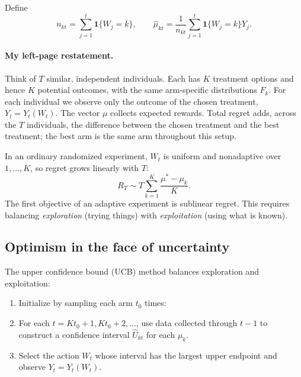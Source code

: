 Define
\[
 n_{kt}=\sum_{j=1}^t\mathbf1\{W_j=k\},\qquad
 \widehat\mu_{kt}=\frac1{n_{kt}}\sum_{j=1}^t\mathbf1\{W_j=k\}Y_j.
\]

\paragraph{My left-page restatement.}
Think of $T$ similar, independent individuals. Each has $K$ treatment options and hence $K$ potential outcomes, with the same arm-specific distributions $F_k$. For each individual we observe only the outcome of the chosen treatment, $Y_t=Y_t(W_t)$. The vector $\mu$ collects expected rewards. Total regret adds, across the $T$ individuals, the difference between the chosen treatment and the best treatment; the best arm is the same arm throughout this setup.

In an ordinary randomized experiment, $W_t$ is uniform and nonadaptive over $1,\ldots,K$, so regret grows linearly with $T$:
\[
 R_T\sim T\sum_{k=1}^K\frac{\mu^*-\mu_k}{K}.
\]
 The first objective of an adaptive experiment is sublinear regret.  This requires balancing \emph{exploration} (trying things) with \emph{exploitation} (using what is known).

\subsection{Optimism in the face of uncertainty}
The upper confidence bound (UCB) method balances exploration and exploitation:
\begin{enumerate}
 \item Initialize by sampling each arm $t_0$ times: 
 \item For each $t=Kt_0+1,Kt_0+2,\ldots$, use data collected through $t-1$ to construct a confidence interval $\widehat U_{kt}$ for each $\mu_k$.
 \item Select the action $W_t$ whose interval has the largest upper endpoint and observe $Y_t=Y_t(W_t)$.
\end{enumerate}

